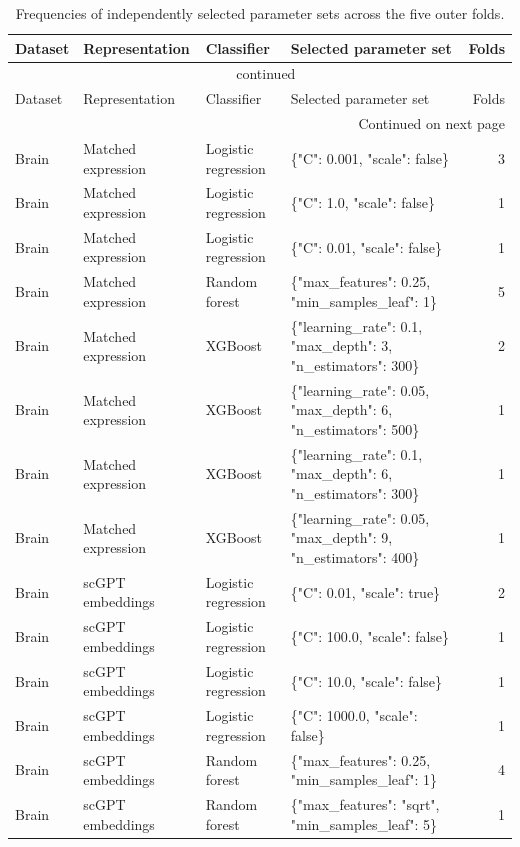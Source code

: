 {\footnotesize\setlength{\tabcolsep}{3pt}
\begin{longtable}{lll>{\raggedright\arraybackslash}p{6.8cm}r}
\caption{Frequencies of independently selected parameter sets across the five outer folds.}\label{tab:s-parameters}\\
\toprule
Dataset & Representation & Classifier & Selected parameter set & Folds \\
\midrule
\endfirsthead
\multicolumn{5}{c}{\tablename\ \thetable{} continued}\\
\toprule
Dataset & Representation & Classifier & Selected parameter set & Folds \\
\midrule
\endhead
\midrule
\multicolumn{5}{r}{Continued on next page}\\
\endfoot
\bottomrule
\endlastfoot
Brain & Matched expression & Logistic regression & \{"C": 0.001, "scale": false\} & 3 \\
Brain & Matched expression & Logistic regression & \{"C": 1.0, "scale": false\} & 1 \\
Brain & Matched expression & Logistic regression & \{"C": 0.01, "scale": false\} & 1 \\
Brain & Matched expression & Random forest & \{"max\_features": 0.25, "min\_samples\_leaf": 1\} & 5 \\
Brain & Matched expression & XGBoost & \{"learning\_rate": 0.1, "max\_depth": 3, "n\_estimators": 300\} & 2 \\
Brain & Matched expression & XGBoost & \{"learning\_rate": 0.05, "max\_depth": 6, "n\_estimators": 500\} & 1 \\
Brain & Matched expression & XGBoost & \{"learning\_rate": 0.1, "max\_depth": 6, "n\_estimators": 300\} & 1 \\
Brain & Matched expression & XGBoost & \{"learning\_rate": 0.05, "max\_depth": 9, "n\_estimators": 400\} & 1 \\
Brain & scGPT embeddings & Logistic regression & \{"C": 0.01, "scale": true\} & 2 \\
Brain & scGPT embeddings & Logistic regression & \{"C": 100.0, "scale": false\} & 1 \\
Brain & scGPT embeddings & Logistic regression & \{"C": 10.0, "scale": false\} & 1 \\
Brain & scGPT embeddings & Logistic regression & \{"C": 1000.0, "scale": false\} & 1 \\
Brain & scGPT embeddings & Random forest & \{"max\_features": 0.25, "min\_samples\_leaf": 1\} & 4 \\
Brain & scGPT embeddings & Random forest & \{"max\_features": "sqrt", "min\_samples\_leaf": 5\} & 1 \\

\end{longtable}}
